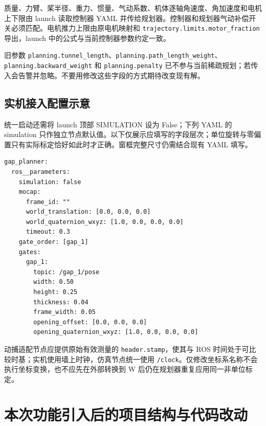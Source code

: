 \documentclass[UTF8,fontset=fandol,a4paper,10pt]{ctexart}
\newcommand{\code}[1]{{\small\nolinkurl{#1}}}
\begin{document}
质量、力臂、桨半径、重力、惯量、气动系数、机体逐轴角速度、角加速度和电机上下限由 launch 读取控制器 YAML 并传给规划器。控制器和规划器气动补偿开关必须匹配。电机推力上限由原电机映射和 \code{trajectory.limits.motor_fraction} 导出，launch 中的公式与当前控制器参数约定一致。

旧参数 \code{planning.tunnel_length}、\code{planning.path_length_weight}、\code{planning.backward_weight} 和 \code{planning.penalty} 已不参与当前稀疏规划；若传入会告警并忽略。不要用修改这些字段的方式期待改变现有解。

\subsection{实机接入配置示意}
统一启动还需将 launch 顶部 SIMULATION 设为 False；下列 YAML 的 simulation 只作独立节点默认值。以下仅展示应填写的字段层次；单位旋转与零偏置只有实际标定恰好如此时才正确。窗框完整尺寸仍需结合现有 YAML 填写。
\begin{lstlisting}
gap_planner:
  ros__parameters:
    simulation: false
    mocap:
      frame_id: ""
      world_translation: [0.0, 0.0, 0.0]
      world_quaternion_wxyz: [1.0, 0.0, 0.0, 0.0]
      timeout: 0.3
    gate_order: [gap_1]
    gates:
      gap_1:
        topic: /gap_1/pose
        width: 0.50
        height: 0.25
        thickness: 0.04
        frame_width: 0.05
        opening_offset: [0.0, 0.0, 0.0]
        opening_quaternion_wxyz: [1.0, 0.0, 0.0, 0.0]
\end{lstlisting}
动捕适配节点应提供原始有效测量的 \code{header.stamp}，使其与 ROS 时间处于可比较时基；实机使用墙上时钟，仿真节点统一使用 \code{/clock}。仅修改坐标系名称不会执行坐标变换，也不应先在外部转换到 W 后仍在规划器重复应用同一非单位标定。

\section{本次功能引入后的项目结构与代码改动}
\end{document}
